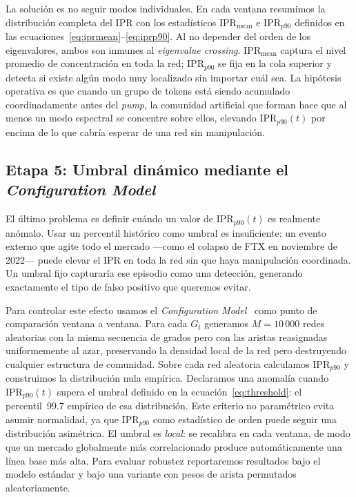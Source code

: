 La solución es no seguir modos individuales. En cada ventana resumimos
la distribución completa del IPR con los estadísticos
$\mathrm{IPR}_{\text{mean}}$ e $\mathrm{IPR}_{p90}$ definidos en las
ecuaciones~\eqref{eq:iprmean}--\eqref{eq:iprp90}. Al no depender del orden de los eigenvalores, ambos son inmunes al
\emph{eigenvalue crossing}. $\mathrm{IPR}_{\text{mean}}$ captura el
nivel promedio de concentración en toda la red; $\mathrm{IPR}_{p90}$
se fija en la cola superior y detecta si existe algún modo muy
localizado sin importar cuál sea. La hipótesis operativa
es que cuando un grupo de tokens está siendo acumulado coordinadamente
antes del \emph{pump}, la comunidad artificial que forman hace que al
menos un modo espectral se concentre sobre ellos, elevando
$\mathrm{IPR}_{p90}(t)$ por encima de lo que cabría esperar de una red
sin manipulación.

\subsection{Etapa 5: Umbral dinámico mediante el \emph{Configuration Model}}

El último problema es definir cuándo un valor de $\mathrm{IPR}_{p90}(t)$
es realmente anómalo. Usar un percentil histórico como umbral es
insuficiente: un evento externo que agite todo el mercado ---como el
colapso de FTX en noviembre de 2022--- puede elevar el IPR en toda la
red sin que haya manipulación coordinada. Un umbral fijo capturaría ese
episodio como una detección, generando exactamente el tipo de falso
positivo que queremos evitar.

Para controlar este efecto usamos el \emph{Configuration
Model}~\cite{newman2003} como punto de comparación ventana a ventana.
Para cada $G_t$ generamos $M = 10\,000$ redes aleatorias con la misma
secuencia de grados pero con las aristas reasignadas uniformemente al
azar, preservando la densidad local de la red pero destruyendo cualquier
estructura de comunidad. Sobre cada red aleatoria calculamos $\mathrm{IPR}_{p90}$ y construimos
la distribución nula empírica. Declaramos una anomalía cuando
$\mathrm{IPR}_{p90}(t)$ supera el umbral definido en la
ecuación~\eqref{eq:threshold}: el percentil~99.7 empírico de esa
distribución. Este criterio no paramétrico evita asumir normalidad, ya
que $\mathrm{IPR}_{p90}$ como estadístico de orden puede seguir una
distribución asimétrica. El umbral es \emph{local}: se recalibra en cada
ventana, de modo que un mercado globalmente más correlacionado produce
automáticamente una línea base más alta. Para evaluar robustez
reportaremos resultados bajo el modelo estándar y bajo una variante con
pesos de arista permutados aleatoriamente.

